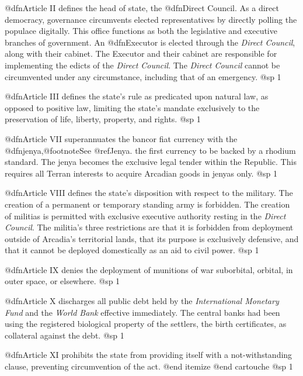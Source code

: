 \item
@dfn{Article II} defines the head of state, the @dfn{Direct Council}. As a direct democracy, governance circumvents elected representatives by directly polling the populace digitally. This office functions as both the legislative and executive branches of government. An @dfn{Executor} is elected through the {\it Direct Council}, along with their cabinet. The Executor and their cabinet are responsible for implementing the edicts of the {\it Direct Council}. The {\it Direct Council} cannot be circumvented under any circumstance, including that of an emergency.
@sp 1

\item
@dfn{Article III} defines the state's rule as predicated upon natural law, as opposed to positive law, limiting the state's mandate exclusively to the preservation of life, liberty, property, and rights.
@sp 1

\item
@dfn{Article VII} superannuates the bancor fiat currency with the @dfn{jenya},@footnote{See @ref{Jenya}.} the first currency to be backed by a rhodium standard. The jenya becomes the exclusive legal tender within the Republic. This requires all Terran interests to acquire Arcadian goods in jenyas only.
@sp 1

\item
@dfn{Article VIII} defines the state's disposition with respect to the military. The creation of a permanent or temporary standing army is forbidden. The creation of militias is permitted with exclusive executive authority resting in the {\it Direct Council}. The militia's three restrictions are that it is forbidden from deployment outside of Arcadia's territorial lands, that its purpose is exclusively defensive, and that it cannot be deployed domestically as an aid to civil power.
@sp 1

\item
@dfn{Article IX} denies the deployment of munitions of war suborbital, orbital, in outer space, or elsewhere.
@sp 1

\item
@dfn{Article X} discharges all public debt held by the {\it International Monetary Fund} and the {\it World Bank} effective immediately. The central banks had been using the registered biological property of the settlers, the birth certificates, as collateral against the debt.
@sp 1

\item
@dfn{Article XI} prohibits the state from providing itself with a not-withstanding clause, preventing circumvention of the act.
@end itemize
@end cartouche
@sp 1


